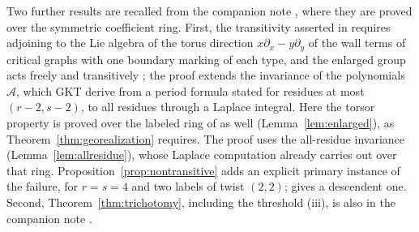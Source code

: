 \documentclass[11pt]{amsart}
\theoremstyle{definition}
\theoremstyle{remark}
\newcommand{\Ascr}{\mathcal{A}}
\begin{document}
Two further results are recalled from the companion note \cite{note}, where
they are proved over the symmetric coefficient ring.  First, the transitivity
asserted in \cite[Thm.~4.27]{GKT} requires adjoining to the Lie algebra of
\cite[Def.~4.23]{GKT} the torus direction $x\partial_x-y\partial_y$ of the
wall terms of critical graphs with one boundary marking of each type, and the
enlarged group acts freely and transitively \cite[Prop.~1.4 and
Rem.~3.1]{note}; the proof extends the invariance of the polynomials $\Ascr$,
which GKT derive from a period formula stated for residues at most
$(r-2,s-2)$, to all residues through a Laplace integral.  Here the torsor property is
proved over the labeled ring of \cite[Def.~4.6]{GKT} as well
(Lemma~\ref{lem:enlarged}), as Theorem~\ref{thm:georealization} requires.  The proof
uses the all-residue invariance (Lemma~\ref{lem:allresidue}), whose Laplace
computation \cite[proof of Prop.~1.4]{note} already carries out over that
ring.  Proposition~\ref{prop:nontransitive} adds an explicit primary instance of the
failure, for $r=s=4$ and two labels of twist $(2,2)$; \cite[Ex.~3.2]{note}
gives a descendent one.  Second, Theorem~\ref{thm:trichotomy}, including the
threshold (iii), is also in the companion note \cite[\S2, Lem.~4.2 and
Prop.~7.1]{note}.
\end{document}
